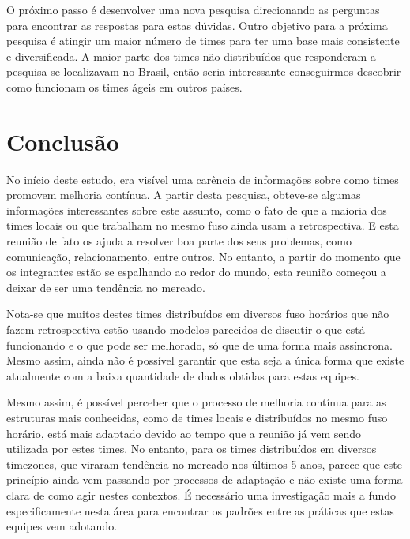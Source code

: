 \documentclass[12pt]{article}
\begin{document}
O próximo passo é desenvolver uma nova pesquisa direcionando as perguntas para encontrar as respostas para estas dúvidas. Outro objetivo para a próxima pesquisa é atingir um maior número de times para ter uma base mais consistente e diversificada. A maior parte dos times não distribuídos que responderam a pesquisa se localizavam no Brasil, então seria interessante conseguirmos descobrir como funcionam os times ágeis em outros países.

\section{Conclusão}

No início deste estudo, era visível uma carência de informações sobre como times promovem melhoria contínua. A partir desta pesquisa, obteve-se algumas informações interessantes sobre este assunto, como o fato de que a maioria dos times locais ou que trabalham no mesmo fuso ainda usam a retrospectiva. E esta reunião de fato os ajuda a resolver boa parte dos seus problemas, como comunicação, relacionamento, entre outros. No entanto, a partir do momento que os integrantes estão se espalhando ao redor do mundo, esta reunião começou a deixar de ser uma tendência no mercado.

Nota-se que muitos destes times distribuídos em diversos fuso horários que não fazem retrospectiva estão usando modelos parecidos de discutir o que está funcionando e o que pode ser melhorado, só que de uma forma mais assíncrona. Mesmo assim, ainda não é possível garantir que esta seja a única forma que existe atualmente com a baixa quantidade de dados obtidas para estas equipes.

Mesmo assim, é possível perceber que o processo de melhoria contínua para as estruturas mais conhecidas, como de times locais e distribuídos no mesmo fuso horário, está mais adaptado devido ao tempo que a reunião já vem sendo utilizada por estes times. No entanto, para os times distribuídos em diversos timezones, que viraram tendência no mercado nos últimos 5 anos, parece que este princípio ainda vem passando por processos de adaptação e não existe uma forma clara de como agir nestes contextos. É necessário uma investigação mais a fundo especificamente nesta área para encontrar os padrões entre as práticas que estas equipes vem adotando.



\end{document}
